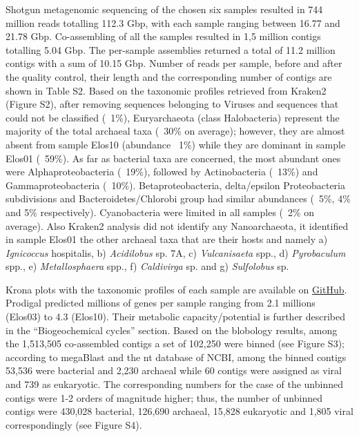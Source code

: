    Shotgun metagenomic sequencing of the chosen six samples resulted in 744 million reads totalling 112.3 Gbp, with each sample ranging between 16.77 and 21.78 Gbp. 
   Co-assembling of all the samples resulted in 1,5 million contigs totalling 5.04 Gbp. 
   The per-sample assemblies returned a total of 11.2 million contigs with a sum of 10.15 Gbp. 
   Number of reads per sample, before and after the quality control, their length and the corresponding number of contigs are shown in Table S2. 
   Based on the taxonomic profiles retrieved from Kraken2 (Figure S2), after removing sequences belonging to Viruses and sequences that could not be classified (~1\%), 
   Euryarchaeota (class Halobacteria) represent the majority of the total archaeal taxa (~30\% on average); 
   however, they are almost absent from sample Elos10 (abundance ~1\%) while they are dominant in sample Elos01 (~59\%). 
   As far as bacterial taxa are concerned, the most abundant ones were Alphaproteobacteria (~19\%), followed by Actinobacteria (~13\%) and Gammaproteobacteria (~10\%). 
   Betaproteobacteria, delta/epsilon Proteobacteria subdivisions and Bacteroidetes/Chlorobi group had similar abundances (~5\%, 4\% and 5\% respectively). 
   Cyanobacteria were limited in all samples (~2\% on average). 
   Also Kraken2 analysis did not identify any Nanoarchaeota, it identified in sample Elos01 the other archaeal taxa that are their hosts and namely 
   a) \textit{Ignicoccus} hospitalis, b) \textit{Acidilobus} sp. 7A, c) \textit{Vulcanisaeta} spp., d) \textit{Pyrobaculum} spp., 
   e) \textit{Metallosphaera} spp., f) \textit{Caldivirga} sp. and g) \textit{Sulfolobus} sp. 

   Krona plots with the taxonomic profiles of each sample are available on \href{https://github.com/hariszaf/karpathos-swamp/tree/main/metaWRAP/Kraken2}{GitHub}. 
   Prodigal predicted millions of genes per sample ranging from 2.1 millions (Elos03) to 4.3 (Elos10). 
   Their metabolic capacity/potential is further described in the “Biogeochemical cycles” section. 
   Based on the blobology results, among the 1,513,505 co-assembled contigs a set of 102,250 were binned (see Figure S3); 
   according to megaBlast and the nt database of NCBI, among the binned contigs 53,536 were bacterial and 2,230 archaeal while 60 contigs were assigned as viral and 739 as eukaryotic. 
   The corresponding numbers for the case of the unbinned contigs were 1-2 orders of magnitude higher; 
   thus, the number of unbinned contigs were 430,028 bacterial, 126,690 archaeal, 15,828 eukaryotic and 1,805  viral correspondingly  (see Figure S4). 


